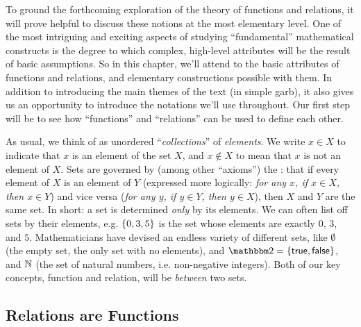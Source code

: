 
    To ground the forthcoming exploration of the theory of functions and relations, it will prove helpful to discuss these notions at the most elementary level. One of the most intriguing and exciting aspects of studying ``fundamental'' mathematical constructs is the degree to which complex, high-level attributes will be the result of basic assumptions. So in this chapter, we'll attend to the basic attributes of functions and relations, and elementary constructions possible with them. In addition to introducing the main themes of the text (in simple garb), it also gives us an opportunity to introduce the notations we'll use throughout. Our first step will be to see how ``functions'' and ``relations'' can be used to define each other.

    As usual, we think of  as unordered ``\textit{collections}'' of \textit{elements}. We write $x\in X$ to indicate that $x$ is an element of the set $X$, and $x\not\in X$ to mean that $x$ is not an element of $X$. Sets are governed by (among other ``axioms'') the : that if every element of $X$ is an element of $Y$ (expressed more logically: \textit{for any $x$, if $x\in X$, then $x\in Y$}) and vice versa (\textit{for any $y$, if $y\in Y$, then $y\in X$}), then $X$ and $Y$ are the same set. In short: a set is determined \textit{only} by its elements. We can often list off sets by their elements, e.g. $\left\{0,3,5\right\}$ is the set whose elements are exactly $0$, $3$, and $5$. Mathematicians have devised an endless variety of different sets, like $\emptyset$ (the empty set, the only set with no elements), and $\Bool = \set{\True,\False}$, and $\mathbb N$ (the set of natural numbers, i.e. non-negative integers). Both of our key concepts, function and relation, will be \textit{between} two sets. 

    \subsection{Relations are Functions}

